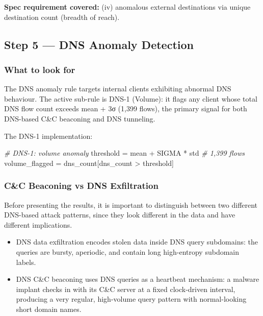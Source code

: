 \documentclass[
  11pt,
]{article}
\newenvironment{Shaded}{\vspace{4pt}}{\vspace{4pt}}
\newcommand{\CommentTok}[1]{\textcolor[rgb]{0.38,0.63,0.69}{\textit{#1}}}
\newcommand{\NormalTok}[1]{#1}
\newcommand{\OperatorTok}[1]{\textcolor[rgb]{0.40,0.40,0.40}{#1}}
\providecommand{\tightlist}{%
  \setlength{\itemsep}{0pt}\setlength{\parskip}{0pt}}
\begin{document}
\medskip
\noindent\colorbox{gray!12}{\parbox{\dimexpr\linewidth-2\fboxsep\relax}{\textbf{Spec requirement covered:} (iv) anomalous external destinations via unique destination count (breadth of reach).}}

\hypertarget{dns-anomaly-detection}{%
\subsection{Step 5 — DNS Anomaly Detection}\label{dns-anomaly-detection}}

\hypertarget{what-to-look-for-6}{%
\subsubsection{What to look for}\label{what-to-look-for-6}}

The DNS anomaly rule targets internal clients exhibiting abnormal DNS
behaviour. The active sub-rule is DNS-1 (Volume): it flags any client
whose total DNS flow count exceeds mean + 3σ (1,399 flows), the primary
signal for both DNS-based C\&C beaconing and DNS tunneling.

The DNS-1 implementation:

\begin{Shaded}
\begin{Highlighting}[]
\CommentTok{\# DNS{-}1: volume anomaly}
\NormalTok{  threshold      }\OperatorTok{=}\NormalTok{ mean }\OperatorTok{+}\NormalTok{ SIGMA }\OperatorTok{*}\NormalTok{ std          }\CommentTok{\# 1,399 flows}
\NormalTok{  volume\_flagged }\OperatorTok{=}\NormalTok{ dns\_count[dns\_count }\OperatorTok{\textgreater{}}\NormalTok{ threshold]}
\end{Highlighting}
\end{Shaded}

\hypertarget{cc-beaconing-vs-dns-exfiltration}{%
\subsubsection{C\&C Beaconing vs DNS
Exfiltration}\label{cc-beaconing-vs-dns-exfiltration}}

Before presenting the results, it is important to distinguish between
two different DNS-based attack patterns, since they look different in
the data and have different implications.

\begin{itemize}
\tightlist
\item
  DNS data exfiltration encodes stolen data inside DNS query subdomains:
  the queries are bursty, aperiodic, and contain long high-entropy
  subdomain labels.
\item
  DNS C\&C beaconing uses DNS queries as a heartbeat mechanism: a
  malware implant checks in with its C\&C server at a fixed clock-driven
  interval, producing a very regular, high-volume query pattern with
  normal-looking short domain names.
\end{itemize}
\end{document}
